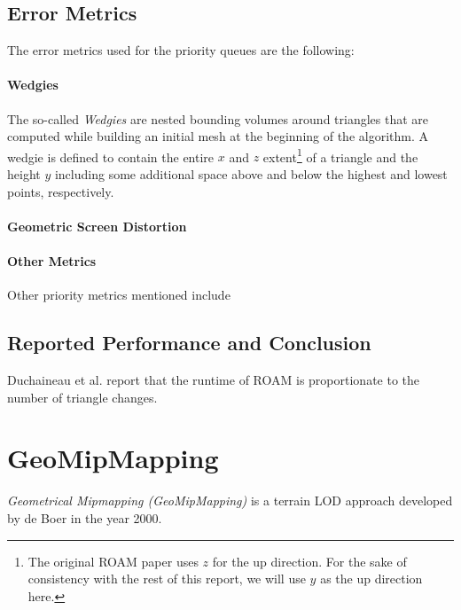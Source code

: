 \subsection{Error Metrics}
The error metrics used for the priority queues are the following:

\paragraph{Wedgies} The so-called \textit{Wedgies} are nested bounding volumes around triangles that are computed 
while building an initial mesh at the beginning of the algorithm.
A wedgie is defined to contain the entire $x$ and $z$ extent\footnote{The original ROAM paper uses $z$ for the up direction. For the sake of consistency with the rest of this report, we will use $y$ as the up direction here.}
of a triangle and the height $y$ including some additional space above and below the highest and lowest points,
respectively.

\paragraph{Geometric Screen Distortion}

\paragraph{Other Metrics} Other priority metrics mentioned include 

\subsection{Reported Performance and Conclusion}
Duchaineau et al. report that the runtime of ROAM is proportionate to the 
number of triangle changes.


\section{GeoMipMapping}
\textit{Geometrical Mipmapping (GeoMipMapping)} is a terrain LOD approach developed by de Boer \cite{geomipmapping} in the year 2000.

